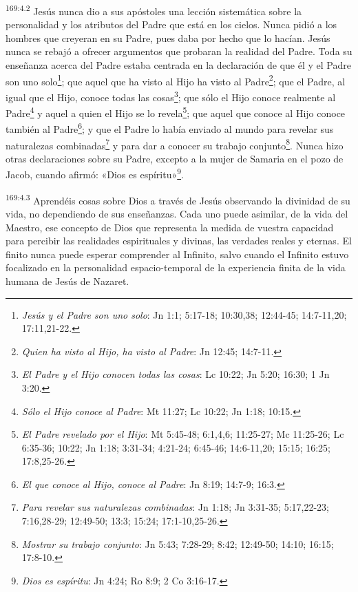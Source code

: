 \par
\textsuperscript{169:4.2} Jesús nunca dio a sus apóstoles una lección sistemática sobre la personalidad y los atributos del Padre que está en los cielos. Nunca pidió a los hombres que creyeran en su Padre, pues daba por hecho que lo hacían. Jesús nunca se rebajó a ofrecer argumentos que probaran la realidad del Padre. Toda su enseñanza acerca del Padre estaba centrada en la declaración de que él y el Padre son uno solo\footnote{\textit{Jesús y el Padre son uno solo}: Jn 1:1; 5:17-18; 10:30,38; 12:44-45; 14:7-11,20; 17:11,21-22.}; que aquel que ha visto al Hijo ha visto al Padre\footnote{\textit{Quien ha visto al Hijo, ha visto al Padre}: Jn 12:45; 14:7-11.}; que el Padre, al igual que el Hijo, conoce todas las cosas\footnote{\textit{El Padre y el Hijo conocen todas las cosas}: Lc 10:22; Jn 5:20; 16:30; 1 Jn 3:20.}; que sólo el Hijo conoce realmente al Padre\footnote{\textit{Sólo el Hijo conoce al Padre}: Mt 11:27; Lc 10:22; Jn 1:18; 10:15.} y aquel a quien el Hijo se lo revela\footnote{\textit{El Padre revelado por el Hijo}: Mt 5:45-48; 6:1,4,6; 11:25-27; Mc 11:25-26; Lc 6:35-36; 10:22; Jn 1:18; 3:31-34; 4:21-24; 6:45-46; 14:6-11,20; 15:15; 16:25; 17:8,25-26.}; que aquel que conoce al Hijo conoce también al Padre\footnote{\textit{El que conoce al Hijo, conoce al Padre}: Jn 8:19; 14:7-9; 16:3.}; y que el Padre lo había enviado al mundo para revelar sus naturalezas combinadas\footnote{\textit{Para revelar sus naturalezas combinadas}: Jn 1:18; Jn 3:31-35; 5:17,22-23; 7:16,28-29; 12:49-50; 13:3; 15:24; 17:1-10,25-26.} y para dar a conocer su trabajo conjunto\footnote{\textit{Mostrar su trabajo conjunto}: Jn 5:43; 7:28-29; 8:42; 12:49-50; 14:10; 16:15; 17:8-10.}. Nunca hizo otras declaraciones sobre su Padre, excepto a la mujer de Samaria en el pozo de Jacob, cuando afirmó: «Dios es espíritu»\footnote{\textit{Dios es espíritu}: Jn 4:24; Ro 8:9; 2 Co 3:16-17.}.

\par
\textsuperscript{169:4.3} Aprendéis cosas sobre Dios a través de Jesús observando la divinidad de su vida, no dependiendo de sus enseñanzas. Cada uno puede asimilar, de la vida del Maestro, ese concepto de Dios que representa la medida de vuestra capacidad para percibir las realidades espirituales y divinas, las verdades reales y eternas. El finito nunca puede esperar comprender al Infinito, salvo cuando el Infinito estuvo focalizado en la personalidad espacio-temporal de la experiencia finita de la vida humana de Jesús de Nazaret.

